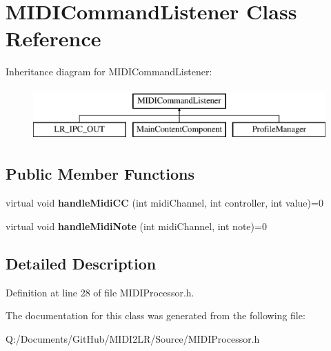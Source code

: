 \hypertarget{class_m_i_d_i_command_listener}{}\section{M\+I\+D\+I\+Command\+Listener Class Reference}
\label{class_m_i_d_i_command_listener}
Inheritance diagram for M\+I\+D\+I\+Command\+Listener\+:\begin{figure}[H]
\begin{center}
\leavevmode
\includegraphics[height=2.000000cm]{class_m_i_d_i_command_listener}
\end{center}
\end{figure}
\subsection*{Public Member Functions}
\begin{DoxyCompactItemize}
\item 
virtual void {\bfseries handle\+Midi\+CC} (int midi\+Channel, int controller, int value)=0\hypertarget{class_m_i_d_i_command_listener_aad409d33d03ab49939b381d62db36e94}{}\label{class_m_i_d_i_command_listener_aad409d33d03ab49939b381d62db36e94}

\item 
virtual void {\bfseries handle\+Midi\+Note} (int midi\+Channel, int note)=0\hypertarget{class_m_i_d_i_command_listener_a21e88217460746b8c568ab563ada630d}{}\label{class_m_i_d_i_command_listener_a21e88217460746b8c568ab563ada630d}

\end{DoxyCompactItemize}


\subsection{Detailed Description}


Definition at line 28 of file M\+I\+D\+I\+Processor.\+h.



The documentation for this class was generated from the following file\+:\begin{DoxyCompactItemize}
\item 
Q\+:/\+Documents/\+Git\+Hub/\+M\+I\+D\+I2\+L\+R/\+Source/M\+I\+D\+I\+Processor.\+h\end{DoxyCompactItemize}
